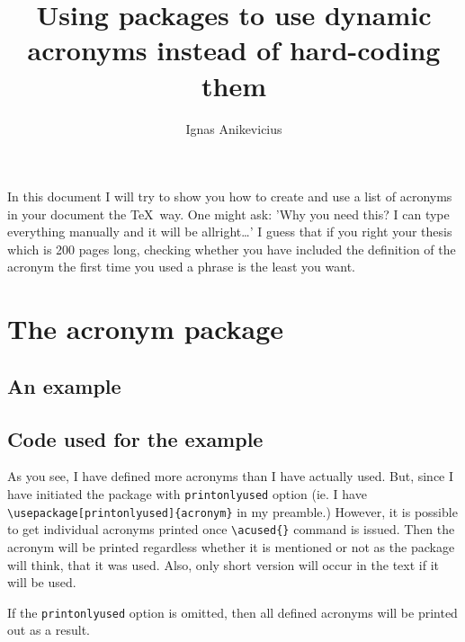 

\usepackage[version=3]{mhchem}
\usepackage[printonlyused]{acronym}
\usepackage[xindy]{glossaries}

\title{Using packages to use dynamic acronyms instead of hard-coding them}
\author{Ignas Anikevicius}


\maketitle

In this document I will try to show you how to create and use a list of acronyms
in your document the \TeX\ way. One might ask: 'Why you need this? I can type
everything manually and it will be allright\ldots' I guess that if you right
your thesis which is 200 pages long, checking whether you have included the
definition of the acronym the first time you used a phrase is the least you
want.

\section{The acronym package}

\subsection{An example}



\subsection{Code used for the example}



As you see, I have defined more acronyms than I have actually used. But, since I
have initiated the package with \verb|printonlyused| option (ie. I have
\verb|\usepackage[printonlyused]{acronym}| in my preamble.) However, it is
possible to get individual acronyms printed once \verb|\acused{}| command is
issued. Then the acronym will be printed regardless whether it is mentioned or
not as the package will think, that it was used. Also, only short version will
occur in the text if it will be used.

If the \verb|printonlyused| option is omitted, then all defined acronyms will be
printed out as a result.

